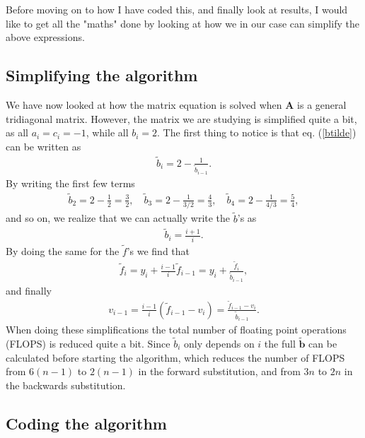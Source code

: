 \documentclass[12pt, a4paper]{article}
\begin{document}
Before moving on to how I have coded this, and finally look at results, I would like to get all the 
"maths" done by looking at how we in our case can simplify the above expressions.    

\subsection{Simplifying the algorithm}
\label{simpl_alg}

We have now looked at how the matrix equation is solved when $\mathbf{A}$ is a general tridiagonal matrix. 
However, the matrix we are studying is simplified quite a bit, as all $a_i = c_i = -1$, while 
all $b_i = 2$. The first thing to notice is that eq. (\ref{btilde}) can be written as 
\begin{align*}
\tilde{b}_i = 2- \frac{1}{\tilde{b}_{i-1}}. 
\end{align*}
By writing the first few terms 
\begin{align*}
\tilde{b}_2 = 2 - \frac{1}{2} = \frac{3}{2}, \quad \tilde{b}_3 = 2- \frac{1}{3/2} = \frac{4}{3}, \quad 
\tilde{b}_4 = 2 - \frac{1}{4/3} = \frac{5}{4}, 
\end{align*}
and so on, we realize that we can actually write the $\tilde{b}$'s as 
\begin{align*}
\tilde{b}_i = \frac{i+1}{i}. 
\end{align*}
By doing the same for the $\tilde{f}$'s we find that 
\begin{align*}
\tilde{f}_i = y_i + \frac{i-1}{i}\tilde{f}_{i-1} = y_i + \frac{\tilde{f}_i}{\tilde{b}_{i-1}}, 
\end{align*}
and finally 
\begin{align*}
v_{i-1} = \frac{i-1}{i}(\tilde{f}_{i-1} - v_i) = \frac{\tilde{f}_{i-1} - v_i}{\tilde{b}_{i-1}}. 
\end{align*}
When doing these simplifications the total number of floating point operations (FLOPS) is reduced quite 
a bit. 
Since $\tilde{b}_i$ only depends on $i$ the full $\mathbf{\tilde{b}}$ can be calculated before starting 
the algorithm, which reduces the number of FLOPS from $6(n-1)$ to $2(n-1)$ in the forward substitution, 
and from $3n$ to $2n$ in the backwards substitution.  

\subsection{Coding the algorithm}
\end{document}
